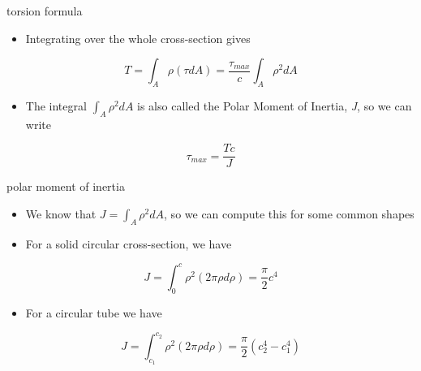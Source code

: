 \documentclass[
  letterpaper,
  ignorenonframetext,
  aspectratio=43,
  handout,
  12pt]{beamer}
\providecommand{\tightlist}{%
  \setlength{\itemsep}{0pt}\setlength{\parskip}{0pt}}
\providecommand{\tightlist}{%
\setlength{\itemsep}{0pt}\setlength{\parskip}{0pt}}
\begin{document}
\begin{frame}{torsion formula}
\protect\hypertarget{torsion-formula-2}{}
\begin{itemize}
\tightlist
\item
  Integrating over the whole cross-section gives
\end{itemize}

\[T = \int_A \rho (\tau dA) = \frac{\tau_{max}}{c} \int_A \rho^2 dA\]

\begin{itemize}
\tightlist
\item
  The integral \(\int_A \rho^2 dA\) is also called the Polar Moment of
  Inertia, \emph{J}, so we can write
\end{itemize}

\[\tau_{max} = \frac{Tc}{J}\]
\end{frame}

\begin{frame}{polar moment of inertia}
\protect\hypertarget{polar-moment-of-inertia}{}
\begin{itemize}
\tightlist
\item
  We know that \(J=\int_A \rho^2 dA\), so we can compute this for some
  common shapes
\item
  For a solid circular cross-section, we have
\end{itemize}

\[J = \int_0^c \rho^2 (2\pi \rho d\rho) = \frac{\pi}{2}c^4\]

\begin{itemize}
\tightlist
\item
  For a circular tube we have
\end{itemize}

\[J = \int_{c_1}^{c_2} \rho^2 (2\pi \rho d\rho) = \frac{\pi}{2}(c_2^4-c_1^4)\]
\end{frame}
\end{document}

